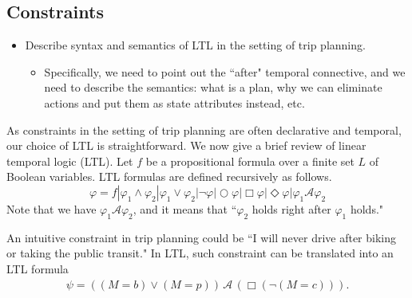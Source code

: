\documentclass[letterpaper]{article}
\newcommand{\cA}{\mathcal{A}}
\begin{document}
\subsection{Constraints}
\begin{itemize}
	\setlength\itemsep{1pt}
	\item Describe syntax and semantics of LTL in the setting of trip planning.
	\begin{itemize}
		\setlength\itemsep{0pt}
		\item Specifically, we need to point out the ``after" temporal connective,
					and we need to describe the semantics: what is a plan, why we can
					eliminate actions and put them as state attributes instead, etc.
	\end{itemize}
\end{itemize}
As constraints in the setting of trip planning are often declarative and
temporal, our choice of LTL is straightforward.
We now give a brief review of linear temporal logic (LTL).
Let $f$ be a propositional formula over a finite set $L$ of Boolean variables.  
LTL formulas are defined recursively as follows.
\begin{equation}
	\varphi = f | \varphi_1 \land \varphi_2 | \varphi_1 \lor \varphi_2 | \neg \varphi | 
		\bigcirc \varphi |	\Box \varphi | \Diamond \varphi | \varphi_1 \cA \varphi_2
\end{equation}
Note that we have $\varphi_1 \cA \varphi_2$, and it means that
``$\varphi_2$ holds right after $\varphi_1$ holds."

An intuitive constraint in trip planning could be ``I will never drive after biking or
taking the public transit."
In LTL, such constraint can be translated into an LTL formula
\begin{align*}
	\psi = ((M=b) \lor (M=p)) \,\cA\, (\Box (\neg (M=c))).
\end{align*}
\end{document}
